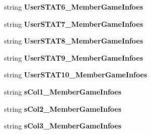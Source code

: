 \begin{DoxyCompactItemize}
\item 
string {\bfseries User\+S\+T\+A\+T6\+\_\+\+Member\+Game\+Infoes}\hypertarget{a00101_ac50269469a35dacae6f6bc1d961c858d}{}\label{a00101_ac50269469a35dacae6f6bc1d961c858d}

\item 
string {\bfseries User\+S\+T\+A\+T7\+\_\+\+Member\+Game\+Infoes}\hypertarget{a00101_a994be4a323832df229566fc701f9de39}{}\label{a00101_a994be4a323832df229566fc701f9de39}

\item 
string {\bfseries User\+S\+T\+A\+T8\+\_\+\+Member\+Game\+Infoes}\hypertarget{a00101_a9f638c9398e512c8db1148e33f08d1bf}{}\label{a00101_a9f638c9398e512c8db1148e33f08d1bf}

\item 
string {\bfseries User\+S\+T\+A\+T9\+\_\+\+Member\+Game\+Infoes}\hypertarget{a00101_a6ebadaaafb7ecbc7f187b02328169221}{}\label{a00101_a6ebadaaafb7ecbc7f187b02328169221}

\item 
string {\bfseries User\+S\+T\+A\+T10\+\_\+\+Member\+Game\+Infoes}\hypertarget{a00101_a8b008dd352bc4253edb10bc030222a41}{}\label{a00101_a8b008dd352bc4253edb10bc030222a41}

\item 
string {\bfseries s\+Col1\+\_\+\+Member\+Game\+Infoes}\hypertarget{a00101_a0dae04857d7d63e3253e0d68c475648f}{}\label{a00101_a0dae04857d7d63e3253e0d68c475648f}

\item 
string {\bfseries s\+Col2\+\_\+\+Member\+Game\+Infoes}\hypertarget{a00101_ad5876be6a2ef2fcb5927fc8efed37a7b}{}\label{a00101_ad5876be6a2ef2fcb5927fc8efed37a7b}

\item 
string {\bfseries s\+Col3\+\_\+\+Member\+Game\+Infoes}\hypertarget{a00101_a2dd8937ada36c7c996d52bc2a183c950}{}\label{a00101_a2dd8937ada36c7c996d52bc2a183c950}


\end{DoxyCompactItemize}
